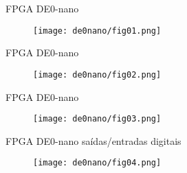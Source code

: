 \documentclass[aspectratio=169]{beamer}
\begin{document}
\begin{frame}{FPGA DE0-nano}
	\justifying
	
	
	\begin{figure}[h]
		\centering
		\texttt{[image: de0nano/fig01.png]}
	\end{figure}	
	
\end{frame}

\begin{frame}{FPGA DE0-nano}
	\justifying
	
	
	\begin{figure}[h]
		\centering
		\texttt{[image: de0nano/fig02.png]}
	\end{figure}	
	
\end{frame}

\begin{frame}{FPGA DE0-nano}
	\justifying
	
	
	\begin{figure}[h]
		\centering
		\texttt{[image: de0nano/fig03.png]}
	\end{figure}	
	
\end{frame}

\begin{frame}{FPGA DE0-nano saídas/entradas digitais}
	\justifying
	
	
	\begin{figure}[h]
		\centering
		\texttt{[image: de0nano/fig04.png]}
	\end{figure}	
	
\end{frame}
\end{document}
